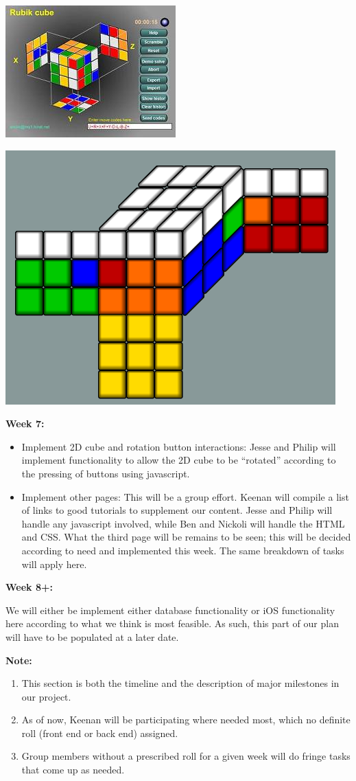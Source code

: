 \documentclass[12pt]{article}
\begin{document}
\par
  \includegraphics[width = .4\textwidth]{rubiks1.PNG}

  \includegraphics[width = .4\textwidth]{rubiks2.PNG}


\textbf{Week 7:}
\begin{itemize}
\item Implement 2D cube and rotation button interactions: Jesse and Philip will implement functionality to allow the 2D cube to be “rotated” according to the pressing of buttons using javascript.
\item Implement other pages: This will be a group effort. Keenan will compile a list of links to good tutorials to supplement our content. Jesse and Philip will handle any javascript involved, while Ben and Nickoli will handle the HTML and CSS. What the third page will be remains to be seen; this will be decided according to need and implemented this week. The same breakdown of tasks will apply here.
\end{itemize}

\par
\textbf{Week 8+:} \\
\par
We will either be implement either database functionality or iOS functionality here according to what we think is most feasible. As such, this part of our plan will have to be populated at a later date. \\

\par
\textbf{Note:}
\begin{enumerate}
\item This section is both the timeline and the description of major milestones in our project.
\item As of now, Keenan will be participating where needed most, which no definite roll (front end or back end) assigned.
\item Group members without a prescribed roll for a given week will do fringe tasks that come up as needed.
\end{enumerate}
\end{document}
